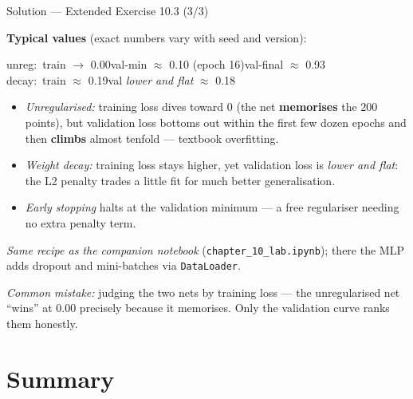 \documentclass[aspectratio=169,11pt]{beamer}
\begin{document}
\begin{frame}{Solution --- Extended Exercise 10.3 (3/3)}
\begin{solutionbox}
  \textbf{Typical values} (exact numbers vary with seed and version):
  \begin{center}\ttfamily\footnotesize
  unreg:\ train $\to$ 0.00\quad val-min $\approx$ 0.10 (epoch 16)\quad val-final $\approx$ 0.93\\[2pt]
  decay:\ train $\approx$ 0.19\quad val \emph{lower and flat} $\approx$ 0.18
  \end{center}
  \begin{itemize}
    \item \emph{Unregularised:} training loss dives toward $0$ (the net \textbf{memorises}
          the $200$ points), but validation loss bottoms out within the first few dozen
          epochs and then \textbf{climbs} almost tenfold --- textbook overfitting.
    \item \emph{Weight decay:} training loss stays higher, yet validation loss is
          \emph{lower and flat}: the L2 penalty trades a little fit for much
          better generalisation.
    \item \emph{Early stopping} halts at the validation minimum --- a free regulariser
          needing no extra penalty term.
  \end{itemize}
  \textit{Same recipe as the companion notebook} (\texttt{chapter\_10\_lab.ipynb});
  there the MLP adds dropout and mini-batches via \texttt{DataLoader}.

  \smallskip
  \textit{Common mistake:} judging the two nets by training loss --- the
  unregularised net ``wins'' at $0.00$ precisely because it memorises.
  Only the validation curve ranks them honestly.
\end{solutionbox}
\end{frame}

\section{Summary}
\end{document}
